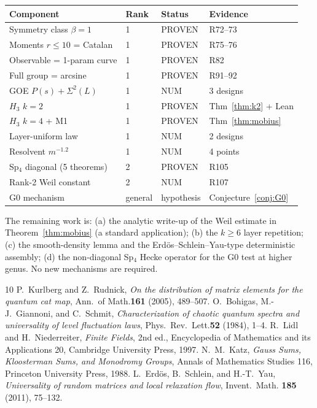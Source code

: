 \documentclass[11pt]{article}
\begin{document}
\begin{center}
\begin{tabular}{llll}
\toprule
Component & Rank & Status & Evidence\\
\midrule
Symmetry class $\beta = 1$ & 1 & PROVEN & R72--73\\
Moments $r \le 10$ = Catalan & 1 & PROVEN & R75--76\\
Observable = 1-param curve & 1 & PROVEN & R82\\
Full group = arcsine & 1 & PROVEN & R91--92\\
GOE $P(s) + \Sigma^2(L)$ & 1 & NUM & 3 designs\\
$H_3$ $k{=}2$ & 1 & PROVEN & Thm~\ref{thm:k2} + Lean\\
$H_3$ $k{=}4$ + M1 & 1 & PROVEN & Thm~\ref{thm:mobius}\\
Layer-uniform law & 1 & NUM & 2 designs\\
Resolvent $m^{-1.2}$ & 1 & NUM & 4 points\\
Sp$_4$ diagonal (5 theorems) & 2 & PROVEN & R105\\
Rank-2 Weil constant & 2 & NUM & R107\\
G0 mechanism & general & hypothesis & Conjecture~\ref{conj:G0}\\
\bottomrule
\end{tabular}
\end{center}

The remaining work is: (a) the analytic write-up of the Weil estimate
in Theorem~\ref{thm:mobius} (a standard application); (b) the
$k \ge 6$ layer repetition; (c) the smooth-density lemma and the
Erd{\"o}s--Schlein--Yau-type deterministic assembly; (d) the
non-diagonal Sp$_4$ Hecke operator for the G0 test at higher genus.
No new mechanisms are required.


\begin{thebibliography}{10}
 P.~Kurlberg and Z.~Rudnick, \emph{On the distribution
of matrix elements for the quantum cat map}, Ann.~of Math.\textbf{161}
(2005), 489--507.
 O.~Bohigas, M.-J.~Giannoni, and C.~Schmit,
\emph{Characterization of chaotic quantum spectra and universality of
level fluctuation laws}, Phys.~Rev.~Lett.\textbf{52} (1984), 1--4.
 R.~Lidl and H.~Niederreiter, \emph{Finite Fields},
2nd ed., Encyclopedia of Mathematics and its Applications 20,
Cambridge University Press, 1997.
 N.~M.~Katz, \emph{Gauss Sums, Kloosterman Sums, and
Monodromy Groups}, Annals of Mathematics Studies 116, Princeton
University Press, 1988.
 L.~Erd{\"o}s, B.~Schlein, and H.-T.~Yau, \emph{Universality
of random matrices and local relaxation flow}, Invent.~Math.
\textbf{185} (2011), 75--132.
\end{thebibliography}
\end{document}
